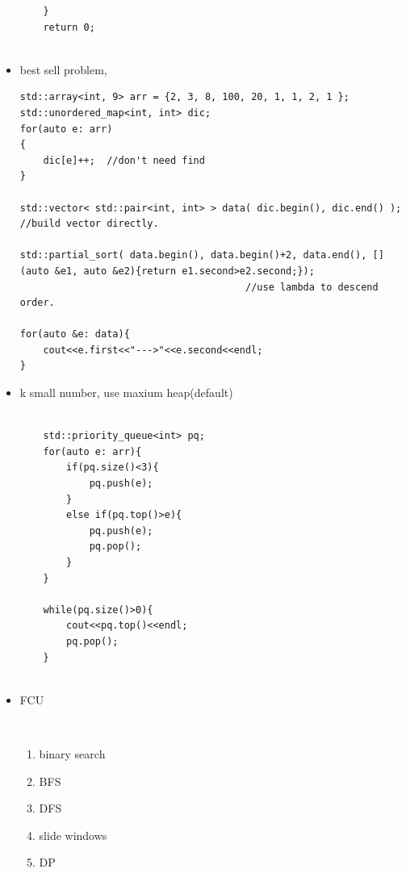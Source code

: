 \documentclass[a4paper,11pt,twoside]{book}
\begin{document}
\begin{itemize}
\begin{lstlisting}
	}
	return 0;
	
\end{lstlisting}

\item best sell problem, 

\begin{lstlisting}
std::array<int, 9> arr = {2, 3, 8, 100, 20, 1, 1, 2, 1 };
std::unordered_map<int, int> dic;
for(auto e: arr)
{
	dic[e]++;  //don't need find
}

std::vector< std::pair<int, int> > data( dic.begin(), dic.end() );  //build vector directly.

std::partial_sort( data.begin(), data.begin()+2, data.end(), [](auto &e1, auto &e2){return e1.second>e2.second;}); 
                                       //use lambda to descend order. 

for(auto &e: data){
	cout<<e.first<<"--->"<<e.second<<endl;
}	
\end{lstlisting}


\item k small number, use maxium heap(default)
\begin{lstlisting}
	
	std::priority_queue<int> pq;
	for(auto e: arr){
		if(pq.size()<3){
			pq.push(e);
		}
		else if(pq.top()>e){
			pq.push(e);
			pq.pop();
		}
	}
	
	while(pq.size()>0){
		cout<<pq.top()<<endl;
		pq.pop();
	}
	
\end{lstlisting}

\item FCU
\begin{lstlisting}
	
\end{lstlisting}



\begin{enumerate}
	\item binary search
	\item BFS
	\item DFS
	\item slide windows
	\item DP
\end{enumerate}

\end{itemize}
\end{document}
